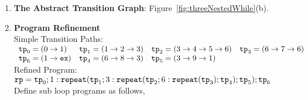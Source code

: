 \begin{enumerate}
  \item  \textbf{The Abstract Transition Graph}: Figure~\ref{fig:threeNestedWhile}(b).

  \item \textbf{Program Refinement}
  \\
  {Simple Transition Paths:}
  \\
$
      \begin{array}{llll}
          \mathtt{tp}_0 = (0 \to 1)
          &
          \mathtt{tp}_1 = (1 \to 2 \to 3)
          &           
          \mathtt{tp}_2 = (3 \to 4 \to 5 \to 6)
          &
          \mathtt{tp}_3 = (6 \to 7 \to 6)
          \\
          \mathtt{tp}_6 = (1 \to \mathtt{ex})
          &
          \mathtt{tp}_4 = (6 \to 8 \to 3)
          &
          \mathtt{tp}_5 = (3 \to 9 \to 1)
      \end{array}
$
  \\
  Refined Program:
\\
$
  \mathtt{rp} = \mathtt{tp}_0 ; 
1: \mathtt{repeat}(\mathtt{tp}_1; 3: \mathtt{repeat}(\mathtt{tp}_2; 6: \mathtt{repeat}(\mathtt{tp}_3); \mathtt{tp}_4); \mathtt{tp}_5); \mathtt{tp}_6
$
\\
Define sub loop programs as follows,


\end{enumerate}
